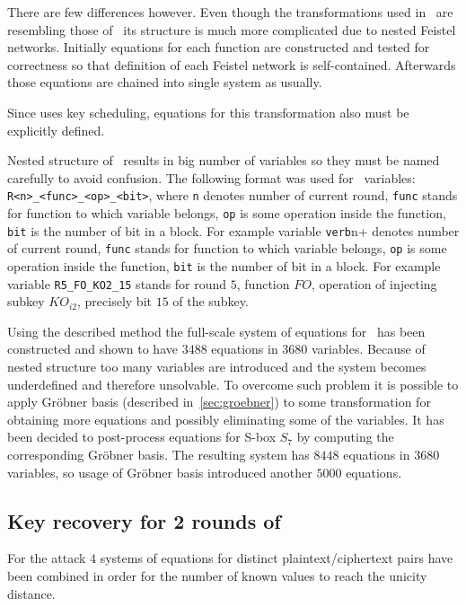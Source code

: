 There are few differences however. Even though the transformations used in
\misty\ are resembling those of \gost\, its structure is much more complicated
due to nested Feistel networks. Initially equations for each function are
constructed and tested for correctness so that definition of each Feistel
network is self-contained. Afterwards those equations are chained into single
system as usually.

Since \misty uses key scheduling, equations for this transformation also must be
explicitly defined.

Nested structure of \misty\ results in big number of variables so they must be
named carefully to avoid confusion. The following format was used for \misty\
variables: \verb+R<n>_<func>_<op>_<bit>+, where \verb+n+ denotes number of
current round, \verb+func+ stands for function to which variable belongs, 
\verb+op+ is some operation inside the function, \verb+bit+ is the number of bit
in a block. For example variable \verb+verb+n+ denotes number of
current round, \verb+func+ stands for function to which variable belongs, 
\verb+op+ is some operation inside the function, \verb+bit+ is the number of bit
in a block. For example variable \verb+R5_FO_KO2_15+ stands for round $5$,
function $FO$, operation of injecting subkey $KO_{i2}$, precisely bit $15$ of
the subkey.

Using the described method the full-scale system of equations for \misty\ 
has been constructed and shown to have $3488$ equations in $3680$ variables. 
Because of nested structure too many
variables are introduced and the system becomes underdefined and therefore
unsolvable. To overcome such problem it is possible to apply Gr\"obner basis 
(described in~\ref{sec:groebner}) to some transformation for obtaining more
equations and possibly eliminating some of the variables. It has been decided to
post-process equations for S-box $S_7$ by computing the corresponding
Gr\"obner basis. The resulting system has $8448$ equations in $3680$ variables, 
so usage of Gr\"obner basis introduced another $5000$ equations.


\subsection{Key recovery for 2 rounds of \misty}
\label{sec:misty-key-rec}

For the attack $4$ systems of equations for distinct
\mbox{plaintext/ciphertext} pairs have been combined in order for
the number of known values to reach the unicity distance.

